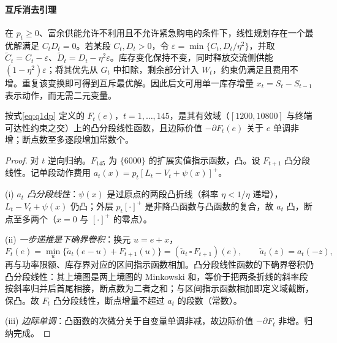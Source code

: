 \paragraph{互斥消去引理}
在 $p_t\ge0$、富余供能允许不利用且不允许紧急购电的条件下，线性规划存在一个最优解满足 $C_tD_t=0$。若某段 $C_t,D_t>0$，令 $\varepsilon=\min\{C_t,D_t/\eta^2\}$，并取 $\widetilde C_t=C_t-\varepsilon$、$\widetilde D_t=D_t-\eta^2\varepsilon$。库存变化保持不变，同时释放交流侧供能 $(1-\eta^2)\varepsilon$；将其优先从 $G_t$ 中扣除，剩余部分计入 $W_t$，约束仍满足且费用不增。重复该变换即可得到互斥最优解。因此后文可用单一库存增量 $x_t=S_t-S_{t-1}$ 表示动作，而无需二元变量。

\begin{proposition}[确定性价值函数的凸分段线性结构]\label{prop:convex}
按式\eqref{eq:q1dp} 定义的 $F_t(e)$，$t=1,\dots,145$，是其有效域（$[1200,10800]$ 与终端可达性约束之交）上的凸分段线性函数，且边际价值 $-\partial F_t(e)$ 关于 $e$ 单调非增；断点数至多逐段增加常数个。
\end{proposition}

\begin{proof}
对 $t$ 逆向归纳。$F_{145}$ 为 $\{6000\}$ 的扩展实值指示函数，凸。设 $F_{t+1}$ 凸分段线性。记单段动作费用 $a_t(x)=p_t[L_t-V_t+\psi(x)]^+$。

(i) \emph{$a_t$ 凸分段线性}：$\psi(x)$ 是过原点的两段凸折线（斜率 $\eta<1/\eta$ 递增），$L_t-V_t+\psi(x)$ 仍凸；外层 $p_t[\cdot]^+$ 是非降凸函数与凸函数的复合，故 $a_t$ 凸，断点至多两个（$x=0$ 与 $[\cdot]^+$ 的零点）。

(ii) \emph{一步递推是下确界卷积}：换元 $u=e+x$，
\[
F_t(e)=\min_{u}\{\check a_t(e-u)+F_{t+1}(u)\}=(\check a_t\,\square\,F_{t+1})(e),\qquad \check a_t(z)=a_t(-z),
\]
再与功率限额、库存界对应的区间指示函数相加。凸分段线性函数的下确界卷积仍凸分段线性：其上境图是两上境图的 Minkowski 和，等价于把两条折线的斜率段按斜率归并后首尾相接，断点数为二者之和；与区间指示函数相加即定义域截断，保凸。故 $F_t$ 凸分段线性，断点增量不超过 $a_t$ 的段数（常数）。

(iii) \emph{边际单调}：凸函数的次微分关于自变量单调非减\cite{rockafellar}，故边际价值 $-\partial F_t$ 非增。归纳完成。
\end{proof}
